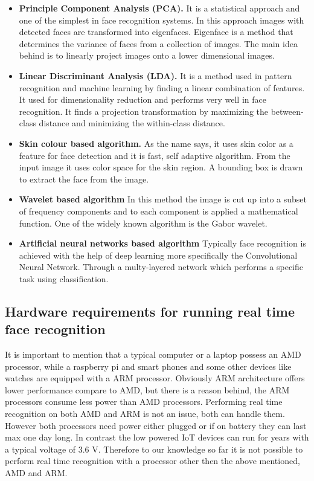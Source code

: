 \begin{itemize}
    \item \textbf{Principle Component Analysis (PCA).} It is a statistical approach and one of the simplest in face recognition systems. In this approach images with detected faces are transformed into eigenfaces. Eigenface is a method that determines the variance of faces from a collection of images. The main idea behind is to linearly project images onto a lower dimensional images. 
    
    
    \item \textbf{Linear Discriminant Analysis (LDA).}
   It is a method used in pattern recognition and machine learning by finding a linear combination of features. It used for dimensionality reduction and performs very well in face recognition. It finds a projection transformation by maximizing the between-class distance and minimizing the within-class distance. 
   
   
   
    \item \textbf{Skin colour based algorithm.}
    As the name says, it uses skin color as a feature for face detection and it is fast, self adaptive algorithm. From the input image it uses color space for the skin region. A bounding box is drawn to extract the face from the image.
    
    
    \item \textbf{Wavelet based algorithm}
    In this method the image is cut up into a subset of frequency components and to each component is applied a mathematical function. One of the widely known algorithm is the Gabor wavelet.
    \item \textbf{Artificial  neural  networks  based  algorithm}
    Typically face recognition is achieved with the help of deep learning more specifically the Convolutional Neural Network. Through a multy-layered network which performs a specific task using classification.
\end{itemize}


\subsection{Hardware requirements for running real time face recognition}

It is important to mention that a typical computer or a laptop possess an AMD processor, while a raspberry pi and smart phones and some other devices like watches are equipped with a ARM processor. Obviously ARM architecture offers lower performance compare to AMD, but there is a reason behind, the ARM processors consume less power than AMD processors. Performing real time recognition on both AMD and ARM is not an issue, both can handle them. However both processors need power either plugged or if on battery they can last max one day long. In contrast the low powered IoT devices can run for years with a typical voltage of 3.6 V. Therefore to our knowledge so far it is not possible to perform real time recognition with a processor other then the above mentioned, AMD and ARM. 

